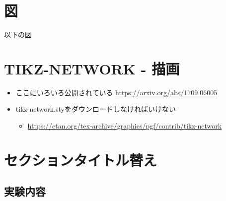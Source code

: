 \documentclass{jsarticle}	       %
\begin{document}
	
	\section{図} \label{section図}
		以下の図
		\begin{figure}
		
		\end{figure}
%

	\section{TIKZ-NETWORK - 描画} \label{TIKZ}
		\begin{itemize}
			\item ここにいろいろ公開されている \url{https://arxiv.org/abs/1709.06005}
			\item tikz-network.styをダウンロードしなければいけない
			\begin{itemize}
				\item \url{https://ctan.org/tex-archive/graphics/pgf/contrib/tikz-network}
			\end{itemize}
		\end{itemize}

	
	\let\oldthesection=\thesection
	\let\oldthesubsection=\thesubsection
	\renewcommand{\thesection}{課題\arabic{section}}
	\renewcommand{\thesubsection}{課題\arabic{section}.\arabic{subsection}}
	\section{セクションタイトル替え} \label{課題1}
		\subsection*{実験内容}
\end{document}

